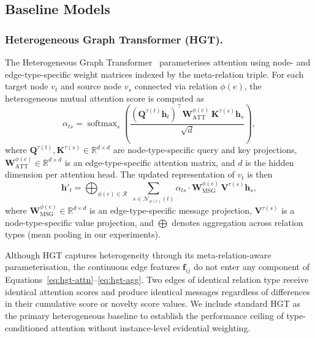\documentclass[a4,center]{NAR}
\newcommand{\hgt}{\textsc{HGT}}
\begin{document}
{\subsection{Baseline Models}
\label{sec:baselines}

\subsubsection{Heterogeneous Graph Transformer (\hgt{}).}
\label{sec:hgt}

The Heterogeneous Graph Transformer~\citep{Hu2020HeterogeneousTransformer} parameterises attention
using node- and edge-type-specific weight matrices indexed by the meta-relation
triple. For each target node $v_t$ and source node $v_s$ connected via relation
$\phi(e)$, the heterogeneous mutual attention score is computed as
\begin{equation}
    \alpha_{ts} = \operatorname{softmax}_{s}\!\left(
        \frac{
            \left(\mathbf{Q}^{\tau(t)} \mathbf{h}_t\right)^\top
            \mathbf{W}^{\phi(e)}_{\mathrm{ATT}}\,
            \mathbf{K}^{\tau(s)} \mathbf{h}_s
        }{\sqrt{d}}
    \right),
    \label{eq:hgt-attn}
\end{equation}
where $\mathbf{Q}^{\tau(t)}, \mathbf{K}^{\tau(s)} \in \mathbb{R}^{d \times d}$
are node-type-specific query and key projections,
$\mathbf{W}^{\phi(e)}_{\mathrm{ATT}} \in \mathbb{R}^{d \times d}$ is an
edge-type-specific attention matrix, and $d$ is the hidden dimension per
attention head. The updated representation of $v_t$ is then
\begin{equation}
    \mathbf{h}'_t = \bigoplus_{\phi(e) \in \mathcal{R}}\;
        \sum_{s \in \mathcal{N}_{\phi(e)}(t)}
            \alpha_{ts}\cdot \mathbf{W}^{\phi(e)}_{\mathrm{MSG}}\,
            \mathbf{V}^{\tau(s)} \mathbf{h}_s,
    \label{eq:hgt-agg}
\end{equation}
where $\mathbf{W}^{\phi(e)}_{\mathrm{MSG}} \in \mathbb{R}^{d \times d}$ is an
edge-type-specific message projection, $\mathbf{V}^{\tau(s)}$ is a
node-type-specific value projection, and $\bigoplus$ denotes aggregation across
relation types (mean pooling in our experiments).

Although \hgt{} captures heterogeneity through its meta-relation-aware
parameterisation, the continuous edge features $\mathbf{f}_{ij}$ do not enter
any component of Equations~\eqref{eq:hgt-attn}--\eqref{eq:hgt-agg}. Two edges
of identical relation type receive identical attention scores and produce
identical messages regardless of differences in their cumulative score or
novelty score
values. We include standard \hgt{} as the primary heterogeneous baseline to
establish the performance ceiling of type-conditioned attention without
instance-level evidential weighting.

}
\end{document}
